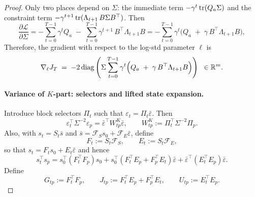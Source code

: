 \begin{proof}
Only two places depend on $\Sigma$:
the immediate term $-\gamma^t\operatorname{tr}(Q_a\Sigma)$ and the constraint term
$-\gamma^{t+1}\operatorname{tr}(\Lambda_{t+1}\,B\Sigma B^\top)$. Then
\[
\frac{\partial \mathcal L}{\partial \Sigma}
= -\sum_{t=0}^{T-1}\gamma^t Q_a \;-\; \sum_{t=0}^{T-1}\gamma^{t+1}\,B^\top\Lambda_{t+1}B = -\sum_{t=0}^{T-1}\gamma^t\Big( Q_a \;+\; \gamma\, B^\top \Lambda_{t+1} B \Big),
\]
Therefore, the gradient with respect to the log-std parameter \(\ell\) is
\begin{equation}
\nabla_\ell J_T
\;=\;
-2\,\mathrm{diag}\left(\Sigma\sum_{t=0}^{T-1}\gamma^t\Big( Q_a \;+\; \gamma\, B^\top \Lambda_{t+1} B \Big)\right)
\;\;\in\mathbb{R}^{m}.
\end{equation}


\paragraph{Variance of $K$-part: selectors and lifted state expansion.}
Introduce block selectors $\Pi_t$ such that $\varepsilon_t=\Pi_t\bar\varepsilon$. Then
\[
\varepsilon_t^\top\Sigma^{-2}\varepsilon_p
=\bar\varepsilon^\top W^K_{tp}\bar\varepsilon,
\qquad
W^K_{tp}:=\Pi_t^\top\Sigma^{-2}\Pi_p.
\]
Also, with $s_t=S_t\bar s$ and $\bar s=\mathcal F_S s_0+\mathcal F_E\bar\varepsilon$, define
\[
F_t:=S_t\mathcal F_S,\qquad E_t:=S_t\mathcal F_E,
\]
so that $s_t=F_t s_0+E_t\bar\varepsilon$ and hence
\begin{equation}\label{eq:stsp_full_expand}
s_t^\top s_p
=s_0^\top(F_t^\top F_p)s_0
+s_0^\top(F_t^\top E_p+F_p^\top E_t)\bar\varepsilon
+\bar\varepsilon^\top(E_t^\top E_p)\bar\varepsilon.
\end{equation}
Define
\[
G_{tp}:=F_t^\top F_p,\qquad
J_{tp}:=F_t^\top E_p+F_p^\top E_t,\qquad
U_{tp}:=E_t^\top E_p.
\]


\end{proof}
